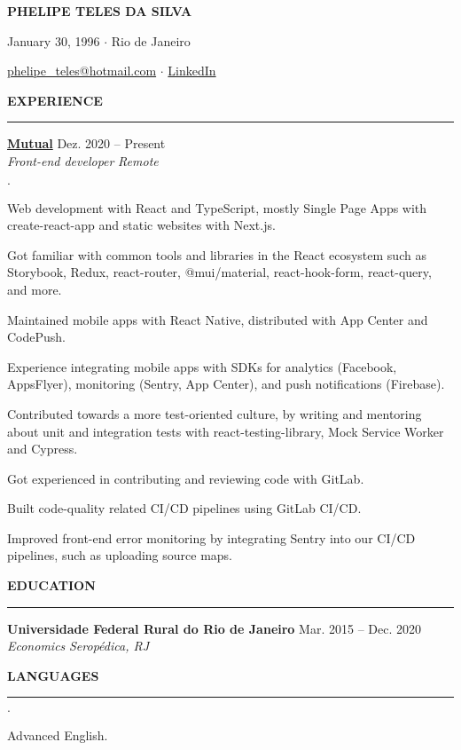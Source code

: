 \documentclass[12pt,letterpaper]{article}
\newenvironment{tightlist}
  {\begin{list}
    {$\cdot$}
    {
      \setlength{\leftmargin}{0em}
      \setlength{\itemsep}{-\smallskipamount}
    }
  }
{\end{list}}
\begin{document}
\pagestyle{empty}

\centerline{\huge\bf PHELIPE TELES DA SILVA}
\medskip

\centerline{January 30, 1996 $\cdot$ Rio de Janeiro}
\smallskip

\centerline{
  \href{mailto:phelipe_teles@hotmail.com}{phelipe\_teles@hotmail.com}
  $\cdot$
  \href{https://linkedin.com/in/phelipeteles}{LinkedIn}
}
\smallskip

\medskip \textbf{EXPERIENCE} \medskip
\hrule

\textbf{\href{https://mutual.club}{Mutual}} \hfill Dez. 2020 -- Present \\
\emph{Front-end developer} \hfill \emph{Remote} {\parfillskip=0pt\par}

\begin{tightlist}
  \item Web development with React and TypeScript, mostly Single Page Apps with
    create-react-app and static websites with Next.js.
  \item Got familiar with common tools and libraries in the React ecosystem such
    as Storybook, Redux, react-router, @mui/material, react-hook-form,
    react-query, and more.
  \item Maintained mobile apps with React Native, distributed with App Center
    and CodePush.
  \item Experience integrating mobile apps with SDKs for analytics (Facebook,
    AppsFlyer), monitoring (Sentry, App Center), and push notifications
    (Firebase).
  \item Contributed towards a more test-oriented culture, by writing and
    mentoring about unit and integration tests with react-testing-library, Mock
    Service Worker and Cypress.
  \item Got experienced in contributing and reviewing code with GitLab.
  \item Built code-quality related CI/CD pipelines using GitLab CI/CD.
  \item Improved front-end error monitoring by integrating Sentry into our CI/CD
    pipelines, such as uploading source maps.
\end{tightlist}

\medskip \textbf{EDUCATION} \medskip
\hrule

\textbf{Universidade Federal Rural do Rio de Janeiro} \hfill {Mar. 2015 -- Dec. 2020} \\
\emph{Economics} \hfill \emph{Seropédica, RJ} {\parfillskip=0pt\par}

\medskip \textbf{LANGUAGES} \medskip
\hrule

\begin{tightlist}
  \item Advanced English.
\end{tightlist}
\end{document}
